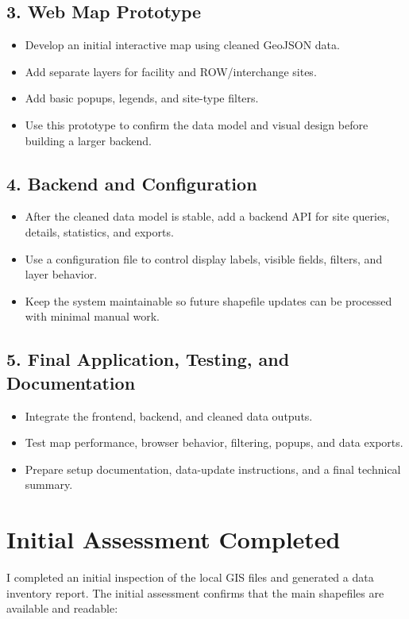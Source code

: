 \documentclass[10pt]{article}
\begin{document}
\subsection{3. Web Map Prototype}
\begin{itemize}
  \item Develop an initial interactive map using cleaned GeoJSON data.
  \item Add separate layers for facility and ROW/interchange sites.
  \item Add basic popups, legends, and site-type filters.
  \item Use this prototype to confirm the data model and visual design before building a larger backend.
\end{itemize}

\subsection{4. Backend and Configuration}
\begin{itemize}
  \item After the cleaned data model is stable, add a backend API for site queries, details, statistics, and exports.
  \item Use a configuration file to control display labels, visible fields, filters, and layer behavior.
  \item Keep the system maintainable so future shapefile updates can be processed with minimal manual work.
\end{itemize}

\subsection{5. Final Application, Testing, and Documentation}
\begin{itemize}
  \item Integrate the frontend, backend, and cleaned data outputs.
  \item Test map performance, browser behavior, filtering, popups, and data exports.
  \item Prepare setup documentation, data-update instructions, and a final technical summary.
\end{itemize}

\section{Initial Assessment Completed}

I completed an initial inspection of the local GIS files and generated a data
inventory report. The initial assessment confirms that the main shapefiles are
available and readable:
\end{document}
